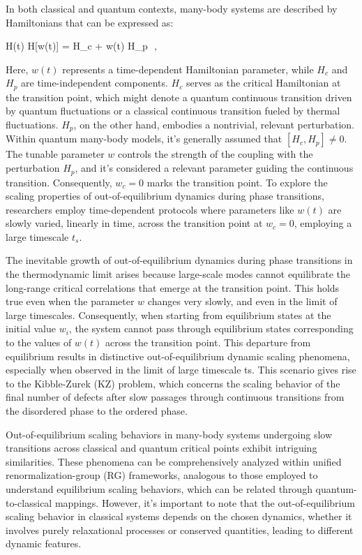 In both classical and quantum contexts, many-body systems are described by Hamiltonians that can be expressed as:

    H(t) \equiv H[w(t)] = H_c + w(t) H_p \,\,,
\ea

Here, $w(t)$ represents a time-dependent Hamiltonian parameter, while $H_c$ and $H_p$ are time-independent components. $H_c$ serves as the critical Hamiltonian at the transition point, which might denote a quantum continuous transition driven by quantum fluctuations or a classical continuous transition fueled by thermal fluctuations. $H_p$, on the other hand, embodies a nontrivial, relevant perturbation. Within quantum many-body models, it's generally assumed that $[H_c, H_p] \neq 0$. The tunable parameter $w$ controls the strength of the coupling with the perturbation $H_p$, and it's considered a relevant parameter guiding the continuous transition. Consequently, $w_c = 0$ marks the transition point. To explore the scaling properties of out-of-equilibrium dynamics during phase transitions, researchers employ time-dependent protocols where parameters like $w(t)$ are slowly varied, linearly in time, across the transition point at $w_c = 0$, employing a large timescale $t_s$.

The inevitable growth of out-of-equilibrium dynamics during phase transitions in the thermodynamic limit arises because large-scale modes cannot equilibrate the long-range critical correlations that emerge at the transition point. This holds true even when the parameter $w$ changes very slowly, and even in the limit of large timescales. Consequently, when starting from equilibrium states at the initial value $w_i$, the system cannot pass through equilibrium states corresponding to the values of $w(t)$ across the transition point. This departure from equilibrium results in distinctive out-of-equilibrium dynamic scaling phenomena, especially when observed in the limit of large timescale ts. This scenario gives rise to the Kibble-Zurek (KZ) problem, which concerns the scaling behavior of the final number of defects after slow passages through continuous transitions from the disordered phase to the ordered phase.

Out-of-equilibrium scaling behaviors in many-body systems undergoing slow transitions across classical and quantum critical points exhibit intriguing similarities. These phenomena can be comprehensively analyzed within unified renormalization-group (RG) frameworks, analogous to those employed to understand equilibrium scaling behaviors, which can be related through quantum-to-classical mappings. However, it's important to note that the out-of-equilibrium scaling behavior in classical systems depends on the chosen dynamics, whether it involves purely relaxational processes or conserved quantities, leading to different dynamic features.

